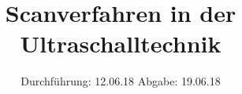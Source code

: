 

\subject{US2}
\title{Scanverfahren in der Ultraschalltechnik}
\date{
  Durchführung: 12.06.18
  \hspace{3em}
  Abgabe: 19.06.18
}



\maketitle
\thispagestyle{empty}
\tableofcontents
\newpage








\newpage
\printbibliography


